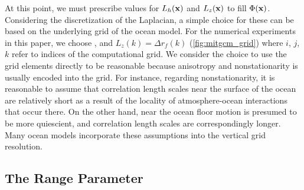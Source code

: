 At this point, we must prescribe values for $L_h(\mathbf{x})$ and $L_z(\mathbf{x})$ to fill
$\Phi(\mathbf{x})$.
Considering the discretization of the Laplacian, a simple choice for these can
be based on the underlying grid of the ocean model.
For the numerical experiments in this paper, we choose
,
and $L_z(k) = \Delta r_f(k)$ (\cref{fig:mitgcm_grid}) where $i$, $j$, $k$ refer
to indices of the computational grid.
We consider the choice to use the grid elements directly to be reasonable
because anisotropy and nonstationarity is usually encoded into the grid.
For instance, regarding nonstationarity, it is reasonable to assume that
correlation length scales near the surface of the ocean are relatively short as
a result of the locality of atmosphere-ocean interactions that occur there.
On the other hand, near the ocean floor motion is presumed to be more
quiescient, and correlation length scales are correspondingly longer.
Many ocean models
\citep[e.g.][]{nguyen_arctic_2021, forgetECCOv4}
incorporate these assumptions into the vertical grid resolution.


\subsection{The Range Parameter}
\label{ssec:range_parameter}

